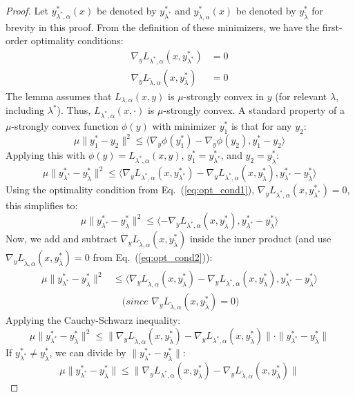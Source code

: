 \documentclass[letterpaper]{article} %
\newcommand{\1}{\mathbf{1}}
\begin{document}
\solutionapprox*
\begin{proof}
Let $y^{*}_{\lambda^*,\alpha}(x)$ be denoted by $y^{*}_{\lambda^*}$ and $y^{*}_{\tilde{\lambda},\alpha}(x)$ be denoted by $y^{*}_{\tilde{\lambda}}$ for brevity in this proof.
From the definition of these minimizers, we have the first-order optimality conditions:
\begin{align}
\nabla_y L_{\lambda^*,\alpha}(x, y^{*}_{\lambda^*}) &= 0 \label{eq:opt_cond1} \\
\nabla_y L_{\tilde{\lambda},\alpha}(x, y^{*}_{\tilde{\lambda}}) &= 0 \label{eq:opt_cond2}
\end{align}
The lemma assumes that $L_{\lambda,\alpha}(x,y)$ is $\mu$-strongly convex in $y$ (for relevant $\lambda$, including $\lambda^*$). Thus, $L_{\lambda^*,\alpha}(x, \cdot)$ is $\mu$-strongly convex.
A standard property of a $\mu$-strongly convex function $\phi(y)$ with minimizer $y_1^*$ is that for any $y_2$:
$$ \mu \|y_1^* - y_2\|^2 \leq \langle \nabla_y \phi(y_1^*) - \nabla_y \phi(y_2), y_1^* - y_2 \rangle $$
Applying this with $\phi(y) = L_{\lambda^*,\alpha}(x,y)$, $y_1^* = y^{*}_{\lambda^*}$, and $y_2 = y^{*}_{\tilde{\lambda}}$:
$$ \mu \|y^{*}_{\lambda^*} - y^{*}_{\tilde{\lambda}}\|^2 \leq \langle \nabla_y L_{\lambda^*,\alpha}(x, y^{*}_{\lambda^*}) - \nabla_y L_{\lambda^*,\alpha}(x, y^{*}_{\tilde{\lambda}}), y^{*}_{\lambda^*} - y^{*}_{\tilde{\lambda}} \rangle $$
Using the optimality condition from Eq.~(\ref{eq:opt_cond1}), $\nabla_y L_{\lambda^*,\alpha}(x, y^{*}_{\lambda^*}) = 0$, this simplifies to:
$$ \mu \|y^{*}_{\lambda^*} - y^{*}_{\tilde{\lambda}}\|^2 \leq \langle - \nabla_y L_{\lambda^*,\alpha}(x, y^{*}_{\tilde{\lambda}}), y^{*}_{\lambda^*} - y^{*}_{\tilde{\lambda}} \rangle $$
Now, we add and subtract $\nabla_y L_{\tilde{\lambda},\alpha}(x, y^{*}_{\tilde{\lambda}})$ inside the inner product (and use $\nabla_y L_{\tilde{\lambda},\alpha}(x, y^{*}_{\tilde{\lambda}}) = 0$ from Eq.~(\ref{eq:opt_cond2})):
\begin{align*}
\mu \|y^{*}_{\lambda^*} - y^{*}_{\tilde{\lambda}}\|^2 &\leq \langle \nabla_y L_{\tilde{\lambda},\alpha}(x, y^{*}_{\tilde{\lambda}}) - \nabla_y L_{\lambda^*,\alpha}(x, y^{*}_{\tilde{\lambda}}), y^{*}_{\lambda^*} - y^{*}_{\tilde{\lambda}} \rangle \\
&\quad \textit{(since } \nabla_y L_{\tilde{\lambda},\alpha}(x, y^{*}_{\tilde{\lambda}}) = 0 \textit{)}
\end{align*}
Applying the Cauchy-Schwarz inequality:
$$ \mu \|y^{*}_{\lambda^*} - y^{*}_{\tilde{\lambda}}\|^2 \leq \|\nabla_y L_{\tilde{\lambda},\alpha}(x, y^{*}_{\tilde{\lambda}}) - \nabla_y L_{\lambda^*,\alpha}(x, y^{*}_{\tilde{\lambda}})\| \cdot \|y^{*}_{\lambda^*} - y^{*}_{\tilde{\lambda}}\| $$
If $y^{*}_{\lambda^*} \neq y^{*}_{\tilde{\lambda}}$, we can divide by $\|y^{*}_{\lambda^*} - y^{*}_{\tilde{\lambda}}\|$:
$$ \mu \|y^{*}_{\lambda^*} - y^{*}_{\tilde{\lambda}}\| \leq \|\nabla_y L_{\lambda^*,\alpha}(x, y^{*}_{\tilde{\lambda}}) - \nabla_y L_{\tilde{\lambda},\alpha}(x, y^{*}_{\tilde{\lambda}})\| $$



\end{proof}
\end{document}
